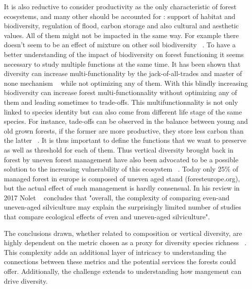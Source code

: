 \documentclass{article}
\begin{document}
It is also reductive to consider productivity as the only characteristic of forest ecosystems, and many other should be accounted for : support of habitat and biodiversity, regulation of flood, carbon storage and also cultural and aesthetic values.
All of them might not be impacted in the same way. For example there doesn't seem to be an effect of mixture on other soil biodiversity ~\autocite{korboulewskyHowTreeDiversity2016}.
To have a better understanding of the impact of biodiversity on forest functioning it seems necessary to study multiple functions at the same time. It has been shown that diversity can increase multi-functionality by the jack-of-all-trades and master of none mechanism ~\autocite{vanderplasJackofalltradesEffectsDrive2016} while not optimizing any of them. With this blindly increasing biodiversity can increase forest multi-functionnality without optimizing any of them and leading sometimes to trade-offs. This multifunctionnality is not only linked to species identity but can also come from different life stage of the same species. For instance, tade-offs can be observed in the balance between young and old grown forests, if the former are more productive, they store less carbon than the latter ~\autocite{caspersenSuccessionalDiversityForest2001}. It is thus important to define the functions that we want to preserve as well as threshold for each of them. Thus vertical diversity brought back in forest by uneven forest management have also been advocated to be a possible solution to the increasing vulnerability of this ecosystem ~\autocite{guldinRoleUnevenAgedSilviculture1996}. Today only 25\% of managed forest in europe is composed of uneven aged stand (foresteurope.org), but the actual effect of such management is hardly consensual. In his review in 2017 Nolet ~\autocite{noletComparingEffectsEven2018} concludes that "overall, the complexity of comparing even-and uneven-aged silviculture may explain the surprisingly limited number of studies that compare ecological effects of even and uneven-aged silviculture".

The conclusions drawn, whether related to composition or vertical diversity, are highly dependent on the metric chosen as a proxy for diversity species richness ~\autocite{juckerClimateModulatesEffects2016, guldinRoleUnevenAgedSilviculture1996, noletComparingEffectsEven2018}. This complexity adds an additional layer of intricacy to understanding the connections between these metrics and the potential services the forests could offer. Additionally, the challenge extends to understanding how mangement can drive diversity. \\
\end{document}
